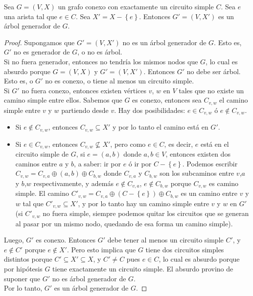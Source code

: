 \begin{lema}
\label{lema_ej3}
Sea $G = (V,X)$ un grafo conexo con exactamente un circuito simple $C$. Sea $e$ una arista tal que $e \in C$. Sea $X' = X - \left\{e\right\}$. Entonces $G' = (V,X')$ es un árbol generador de $G$.
\end{lema}
\begin{proof}
Supongamos que $G' = (V,X')$ no es un árbol generador de $G$. Esto es, $G'$ no es generador de $G$, o no es árbol. \\
Si no fuera generador, entonces no tendría los mismos nodos que $G$, lo cual es absurdo porque $G = (V,X)$ y $G' = (V,X')$.
Entonces $G'$ no debe ser árbol. Esto es, o $G'$ no es conexo, o tiene al menos un circuito simple. \\
Si $G'$ no fuera conexo, entonces existen vértices $v$, $w$ en $V$ tales que no existe un camino simple entre ellos. Sabemos que $G$ es conexo, entonces sea $C_{v,w}$ el camino simple entre $v$ y $w$ partiendo desde $v$. Hay dos posibilidades: $e \in C_{v,w}$ ó $e \notin C_{v,w}$. 
\begin{itemize}
\item Si $e \notin C_{v,w}$, entonces $C_{v,w} \subseteq X'$ y por lo tanto el camino está en $G'$. 
\item Si $e \in C_{v,w}$, entonces $C_{v,w} \not\subseteq X'$, pero como $e \in C$, es decir, $e$ está en el circuito simple de $G$, si $e = (a,b)$ donde $a, b \in V$, entonces existen dos caminos entre $a$ y $b$, a saber: ir por $e$ ó ir por $C - \left\{e\right\}$. Podemos escribir $C_{v,w} = C_{v,a} \oplus (a,b) \oplus C_{b,w}$ donde $C_{v,a}$ y $C_{b,w}$ son los subcaminos entre $v$,$a$ y $b$,$w$ respectivamente, y además $e \notin C_{v,a}$, $e \notin C_{b,w}$ porque $C_{v,w}$ es camino simple. El camino $C'_{v,w} = C_{v,a} \oplus (C - \left\{e\right\}) \oplus C_{b,w}$ es un camino entre $v$ y $w$ tal que $C'_{v,w} \subseteq X'$, y por lo tanto hay un camino simple entre $v$ y $w$ en $G'$ (si $C'_{v,w}$ no fuera simple, siempre podemos quitar los circuitos que se generan al pasar por un mismo nodo, quedando de esa forma un camino simple).
\end{itemize}
Luego, $G'$ es conexo. Entonces $G'$ debe tener al menos un circuito simple $C'$, y $e \notin C'$ porque $e \notin X'$. Pero esto implica que $G$ tiene dos circuitos simples distintos porque $C' \subseteq X' \subseteq X$, y $C' \neq C$ pues $e \in C$, lo cual es absurdo porque por hipótesis $G$ tiene exactamente un circuito simple. El absurdo provino de suponer que $G'$ no es árbol generador de $G$. \\ Por lo tanto, $G'$ es un árbol generador de $G$.
\end{proof}

